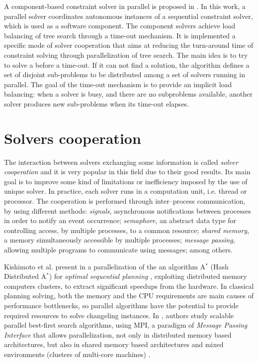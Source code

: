 A component-based constraint solver in parallel is proposed in \cite{Zoeteweij}. In this work, a parallel solver coordinates autonomous instances of a sequential constraint solver, which is used as a software component. The component solvers achieve load balancing of tree search through a time-out mechanism. It is implemented a specific mode of solver cooperation that aims at reducing the turn-around time of constraint solving through parallelization of tree search. The main idea is to try to solve a \csp{} before a time-out. If it can not find a solution, the algorithm defines a set of disjoint sub-problems to be distributed among a set of solvers running in parallel. The goal of the time-out mechanism is to provide an implicit load balancing: when a solver is busy, and there are no subproblems available, another solver produces new sub-problems when its time-out elapses.



\section{Solvers cooperation}
\label{sec:cooperation}

The interaction between solvers exchanging some information is called {\it solver cooperation} and it is very popular in this field due to their good results. Its main goal is to improve some kind of limitations or inefficiency imposed by the use of unique solver. In practice, each solver runs in a computation unit, i.e. thread or processor. The cooperation is performed through inter--process communication, by using different methods: \textit{signals}, asynchronous notifications between processes in order to notify an event occurrence; \textit{semaphore}, an abstract data type for controlling access, by multiple processes, to a common resource; \textit{shared memory}, a memory simultaneously accessible by multiple processes; \textit{message passing}, allowing multiple programs to communicate using messages; among others.

Kishimoto et al. present in \cite{Kishimoto2009} a parallelization of the an algorithm A$^*$ (Hash Distributed A$^*$) for \textit{optimal sequential planning} \cite{Schmegner2004}, exploiting distributed memory computers clusters, to extract significant speedups from the hardware. In classical planning solving, both the memory and the CPU requirements are main causes of performance bottlenecks, so parallel algorithms have the potential to provide required resources to solve changeling instances. In \cite{Kishimoto2013}, authors study scalable parallel best-first search algorithms, using MPI, a paradigm of \textit{Message Passing Interface} that allows parallelization, not only in distributed memory based architectures, but also in shared memory based architectures and mixed environments (clusters of multi-core machines) \cite{Grama2003a}.

